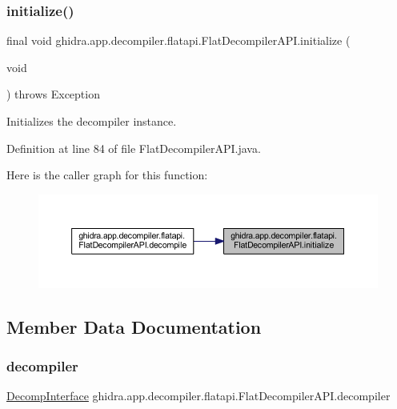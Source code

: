 \subsubsection{\texorpdfstring{initialize()}{initialize()}}
{\footnotesize\ttfamily final void ghidra.\+app.\+decompiler.\+flatapi.\+Flat\+Decompiler\+A\+P\+I.\+initialize (\begin{DoxyParamCaption}\item[{void}]{ }\end{DoxyParamCaption}) throws Exception\hspace{0.3cm}{\ttfamily [inline]}}

Initializes the decompiler instance. 

Definition at line 84 of file Flat\+Decompiler\+A\+P\+I.\+java.

Here is the caller graph for this function\+:
\nopagebreak
\begin{figure}[H]
\begin{center}
\leavevmode
\includegraphics[width=350pt]{classghidra_1_1app_1_1decompiler_1_1flatapi_1_1_flat_decompiler_a_p_i_af9bcfa6f53c58142ecd498dd1151a31d_icgraph}
\end{center}
\end{figure}


\subsection{Member Data Documentation}
\mbox{\label{classghidra_1_1app_1_1decompiler_1_1flatapi_1_1_flat_decompiler_a_p_i_a6ba7c5f405fc16d12abe7b6714a01fb3}} 
\subsubsection{\texorpdfstring{decompiler}{decompiler}}
{\footnotesize\ttfamily \mbox{\hyperlink{classghidra_1_1app_1_1decompiler_1_1_decomp_interface}{Decomp\+Interface}} ghidra.\+app.\+decompiler.\+flatapi.\+Flat\+Decompiler\+A\+P\+I.\+decompiler\hspace{0.3cm}{\ttfamily [protected]}}



